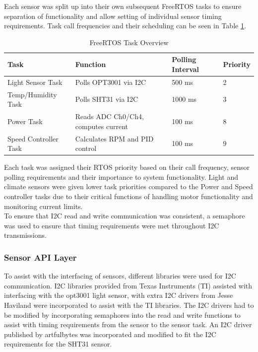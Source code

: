 \documentclass[a4paper, 11pt, titlepage]{article}
\begin{document}
Each sensor was split up into their own subsequent FreeRTOS tasks \parencite{freertos} to ensure separation of functionality and allow setting of individual sensor timing requirements. Task call frequencies and their scheduling can be seen in Table \ref{tab:rtos-tasks}.

\begin{table}[H]
    \centering
    \caption{FreeRTOS Task Overview}
    \label{tab:rtos-tasks}
    \begin{tabularx}{\textwidth}{|l|l|X|l|}
    \hline
    \textbf{Task} & \textbf{Function} & \textbf{Polling Interval} & \textbf{Priority} \\ \hline
    Light Sensor Task & Polls OPT3001 via I2C & 500 ms & 2 \\ \hline
    Temp/Humidity Task & Polls SHT31 via I2C & 1000 ms & 3 \\ \hline
    Power Task & Reads ADC Ch0/Ch4, computes current & 100 ms & 8 \\ \hline
    Speed Controller Task & Calculates RPM and PID control & 100 ms & 9 \\ \hline
    \end{tabularx}
\end{table}

Each task was assigned their RTOS priority based on their call frequency, sensor polling requirements and their importance to system functionality. Light and climate sensors were given lower task priorities compared to the Power and Speed controller tasks due to their critical functions of handling motor functionality and monitoring current limits.\\

To ensure that I2C read and write communication was consistent, a semaphore was used to ensure that timing requirements were met throughout I2C transmissions.


\subsubsection{Sensor API Layer}

To assist with the interfacing of sensors, different libraries were used for I2C communication. I2C libraries provided from Texas Instruments (TI) assisted with interfacing with the opt3001 light sensor, with extra I2C drivers from Jesse Haviland \parencite{haviland_i2c} were incorporated to assist with the TI libraries. The I2C drivers had to be modified by incorporating semaphores into the read and write functions to assist with timing requirements from the sensor to the sensor task. An I2C driver published by artfulbytes \parencite{vl53l0x} was incorporated and modified to fit the I2C requirements for the SHT31 sensor.\\
\end{document}

